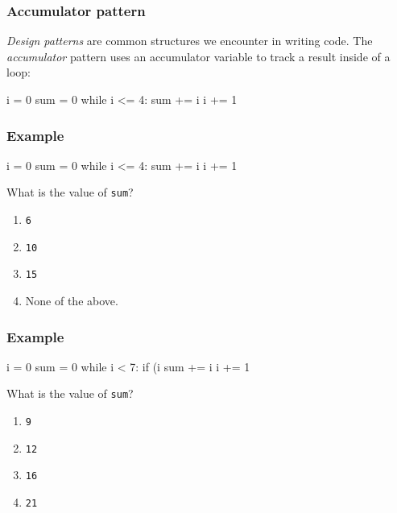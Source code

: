 \documentclass[11pt]{beamer}
\begin{document}
\begin{frame}[fragile]
  \frametitle{Accumulator pattern}
  \Enlarge

  \begin{itemize}
  \myitem  \emph{Design patterns} are common structures we encounter in writing code. %
  \myitem  The \emph{accumulator} pattern uses an accumulator variable to track a result inside of a loop: %
  \begin{semiverbatim}
i = 0
sum = 0
while i <= 4:
    sum += i
    i += 1
  \end{semiverbatim}
  \end{itemize}
\end{frame}

\begin{frame}[fragile]
  \frametitle{Example}
  \Enlarge

  \begin{semiverbatim}
i = 0
sum = 0
while i <= 4:
    sum += i
    i += 1
  \end{semiverbatim}
  What is the value of \texttt{sum}?
  \begin{enumerate}[label=\Alph*]
  \item  \texttt{6}
  \item  \texttt{10}
  \item  \texttt{15}
  \item  None of the above.
  \end{enumerate}
\end{frame}

\begin{frame}[fragile]
  \frametitle{Example}
  \Enlarge

  \begin{semiverbatim}
i = 0
sum = 0
while i < 7:
    if (i %
        sum += i
        i += 1
  \end{semiverbatim}
  What is the value of \texttt{sum}?
  \begin{enumerate}[label=\Alph*]
  \item  \texttt{9}
  \item  \texttt{12}
  \item  \texttt{16}
  \item  \texttt{21}
  \end{enumerate}
\end{frame}
\end{document}
